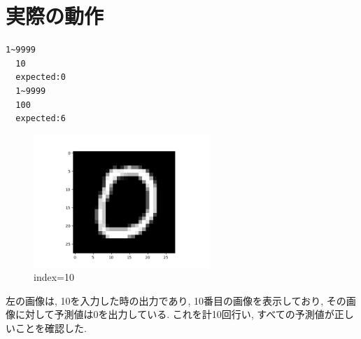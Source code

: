 \documentclass[a4paper,11pt]{jsarticle}
\begin{document}
\section{実際の動作}
\begin{lstlisting}[caption=Actual Move]
  1~9999
  10
  expected:0
  1~9999
  100
  expected:6
\end{lstlisting}
\begin{figure}
  \centering
      \includegraphics[height = 5cm]{Figure_1.png}
      \centering
        \caption{index=10}
\end{figure}

左の画像は, 10を入力した時の出力であり, 10番目の画像を表示しており,
その画像に対して予測値は0を出力している. これを計10回行い, 
すべての予測値が正しいことを確認した.
\end{document}
